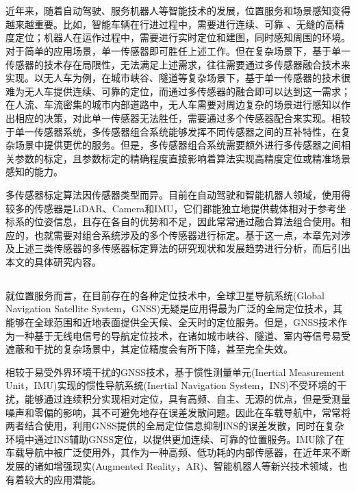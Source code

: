 
\chapter{}
\normf
近年来，随着自动驾驶、服务机器人等智能技术的发展，位置服务和场景感知变得越来越重要。比如，智能车辆在行进过程中，需要进行连续、可靠 、无缝的高精度定位；机器人在运作过程中，需要进行实时定位和建图，同时感知周围的环境。对于简单的应用场景，单一传感器即可胜任上述工作。但在复杂场景下，基于单一传感器的技术存在局限性，无法满足上述需求，往往需要通过多传感器融合技术来实现。以无人车为例，在城市峡谷、隧道等复杂场景下，基于单一传感器的技术很难为无人车提供连续、可靠的定位，而通过多传感器的融合即可以达到这一需求；在人流、车流密集的城市内部道路中，无人车需要对周边复杂的场景进行感知以作出相应的决策，对此单一传感器无法胜任，需要通过多个传感器配合来实现。相较于单一传感器系统，多传感器组合系统能够发挥不同传感器之间的互补特性，在复杂场景中提供更优的服务。但是，多传感器组合系统需要额外进行多传感器之间相关参数的标定，且参数标定的精确程度直接影响着算法实现高精度定位或精准场景感知的能力。

多传感器标定算法因传感器类型而异。目前在自动驾驶和智能机器人领域，使用得较多的传感器是LiDAR、Camera和IMU，它们都能独立地提供载体相对于参考坐标系的位姿信息，且存在各自的优势和不足，因此常常通过融合算法组合使用。相应的，也就需要对组合系统涉及的多个传感器进行标定。基于这一点，本章先对涉及上述三类传感器的多传感器标定算法的研究现状和发展趋势进行分析，而后引出本文的具体研究内容。

\section{}
就位置服务而言，在目前存在的各种定位技术中，全球卫星导航系统(Global Navigation Satellite System，GNSS)无疑是应用得最为广泛的全局定位技术，其能够在全球范围和近地表面提供全天候、全天时的定位服务。但是，GNSS技术作为一种基于无线电信号的导航定位技术，在诸如城市峡谷、隧道、室内等信号易受遮蔽和干扰的复杂场景中，其定位精度会有所下降，甚至完全失效\cite{li2023multi}。

相较于易受外界环境干扰的GNSS技术，基于惯性测量单元(Inertial Measurement Unit，IMU)实现的惯性导航系统(Inertial Navigation System，INS)不受环境的干扰，能够通过连续积分实现相对定位，具有高频、自主、无源的优点，但是受测量噪声和零偏的影响，其不可避免地存在误差发散问题。因此在车载导航中，常常将两者结合使用，利用GNSS提供的全局定位信息抑制INS的误差发散，同时在复杂环境中通过INS辅助GNSS定位，以提供更加连续、可靠的位置服务\cite{titterton2004strapdown}。IMU除了在车载导航中被广泛使用外，其作为一种高频、低功耗的内部传感器，在近年来不断发展的诸如增强现实(Augmented Reality，AR)、智能机器人等新兴技术领域，也有着较大的应用潜能。

